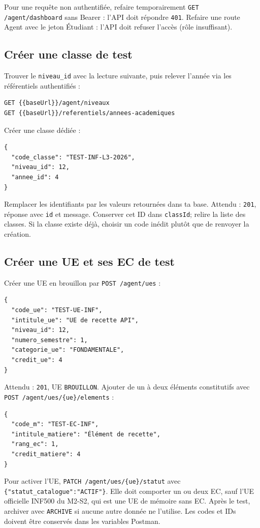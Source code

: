 \documentclass[10pt,a4paper]{article}
\newcommand{\method}[1]{\texttt{\small #1}}
\begin{document}
Pour une requête non authentifiée, refaire temporairement \texttt{GET /agent/dashboard} sans Bearer : l’API doit répondre \texttt{401}. Refaire une route Agent avec le jeton Étudiant : l’API doit refuser l’accès (rôle insuffisant).

\subsection{Créer une classe de test}

Trouver le \texttt{niveau\_id} avec la lecture suivante, puis relever l’année via les référentiels authentifiés :
\begin{lstlisting}
GET {{baseUrl}}/agent/niveaux
GET {{baseUrl}}/referentiels/annees-academiques
\end{lstlisting}
Créer une classe dédiée :
\begin{lstlisting}
{
  "code_classe": "TEST-INF-L3-2026",
  "niveau_id": 12,
  "annee_id": 4
}
\end{lstlisting}

Remplacer les identifiants par les valeurs retournées dans ta base. Attendu : \texttt{201}, réponse avec \texttt{id} et message. Conserver cet ID dans \texttt{classId}; relire la liste des classes. Si la classe existe déjà, choisir un code inédit plutôt que de renvoyer la création.

\subsection{Créer une UE et ses EC de test}

Créer une UE en brouillon par \method{POST /agent/ues} :
\begin{lstlisting}
{
  "code_ue": "TEST-UE-INF",
  "intitule_ue": "UE de recette API",
  "niveau_id": 12,
  "numero_semestre": 1,
  "categorie_ue": "FONDAMENTALE",
  "credit_ue": 4
}
\end{lstlisting}

Attendu : \texttt{201}, UE \texttt{BROUILLON}. Ajouter de un à deux éléments constitutifs avec \method{POST /agent/ues/\{ue\}/elements} :
\begin{lstlisting}
{
  "code_m": "TEST-EC-INF",
  "intitule_matiere": "Élément de recette",
  "rang_ec": 1,
  "credit_matiere": 4
}
\end{lstlisting}

Pour activer l’UE, \method{PATCH /agent/ues/\{ue\}/statut} avec \texttt{\{"statut\_catalogue":"ACTIF"\}}. Elle doit comporter un ou deux EC, sauf l’UE officielle INF500 du M2-S2, qui est une UE de mémoire sans EC. Après le test, archiver avec \texttt{ARCHIVE} si aucune autre donnée ne l’utilise. Les codes et IDs doivent être conservés dans les variables Postman.
\end{document}
